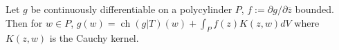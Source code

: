 Let $g$ be continuously differentiable on a polycylinder $P$, $f := \partial g / \partial \overline{z}$ bounded. Then for $w \in P$, $g(w) = \operatorname{ch}(g|T)(w) + \int_P f(z) K(z,w) dV$ where $K(z,w)$ is the Cauchy kernel.
